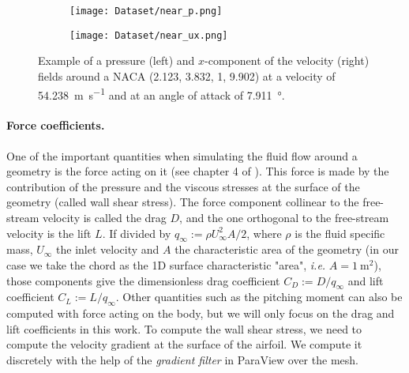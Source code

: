 \begin{figure}
	\centering
	\begin{subfigure}{0.49\textwidth}
		\centering
		\texttt{[image: Dataset/near\_p.png]}
	\end{subfigure}
	\begin{subfigure}{0.49\textwidth}
		\centering
		\texttt{[image: Dataset/near\_ux.png]}
	\end{subfigure}
	\caption[Example of fields around an airfoil.]{Example of a pressure (left) and $x$-component of the velocity (right) fields around a \acrshort{NACA} (2.123, 3.832, 1, 9.902) at a velocity of \SI{54.238}{\meter\per\second} and at an angle of attack of \SI{7.911}{\degree}.}
	\label{fig:NACA_field}
\end{figure}

\paragraph{Force coefficients.} One of the important quantities when simulating the fluid flow around a geometry is the force acting on it (see chapter 4 of \cite{aero}). This force is made by the contribution of the pressure and the viscous stresses at the surface of the geometry (called wall shear stress). The force component collinear to the free-stream velocity is called the drag $D$, and the one orthogonal to the free-stream velocity is the lift $L$. If divided by $q_\infty := \rho U_\infty^2 A/2$, where $\rho$ is the fluid specific mass, $U_\infty$ the inlet velocity and $A$ the characteristic area of the geometry (in our case we take the chord as the 1D surface characteristic "area", \emph{i.e.} $A = \SI{1}{\square\meter}$), those components give the dimensionless drag coefficient $C_D := D/q_\infty$ and lift coefficient $C_L := L/q_\infty$. Other quantities such as the pitching moment can also be computed with force acting on the body, but we will only focus on the drag and lift coefficients in this work. To compute the wall shear stress, we need to compute the velocity gradient at the surface of the airfoil. We compute it discretely with the help of the \emph{gradient filter} in ParaView \cite{paraview} over the mesh.

